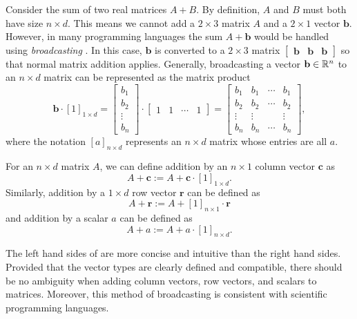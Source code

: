 \def\b{\mathbf{b}}
Consider the sum of two real matrices \(A + B\).
By definition, \(A\) and \(B\) must both have size \(n \times d\).
This means we cannot add a \(2 \times 3\) matrix \(A\) and a \(2 \times 1\) vector \(\b\).
However, in many programming languages the sum \(A + \b\) would be handled using \textit{broadcasting} \cite{harris2020array}.
In this case, \(\b\) is converted to a \(2 \times 3\) matrix \(\begin{bmatrix} \b & \b & \b \end{bmatrix}\) so that normal matrix addition applies.
Generally, broadcasting a vector \(\b \in \RR^n\) to an \(n \times d\) matrix can be represented as the matrix product
\begin{equation}
    \label{eqn:vector-broadcasting}
    \b \cdot [1]_{1 \times d}
    = \begin{bmatrix}
        b_1 \\ b_2 \\ \vdots \\ b_n
    \end{bmatrix}
    \cdot
    \begin{bmatrix}
        1 & 1 & \cdots & 1
    \end{bmatrix}
    = \begin{bmatrix}
        b_1 & b_1 & \cdots & b_1 \\
        b_2 & b_2 & \cdots & b_2 \\
        \vdots & \vdots & & \vdots \\
        b_n & b_n & \cdots & b_n
    \end{bmatrix},
\end{equation}
where the notation \([a]_{n \times d}\) represents an \(n \times d\) matrix whose entries are all \(a\).
\begin{definition}
    \label{def:broadcast-addition}
    For an \(n \times d\) matrix \(A\), we can define addition by an \(n \times 1\) column vector \(\mathbf{c}\) as
    \begin{equation}
        \label{eqn:matrix-col-vector-addition}
        A + \mathbf{c} := A + \mathbf{c} \cdot [1]_{1 \times d}.
    \end{equation}
    Similarly, addition by a \(1 \times d\) row vector \(\mathbf{r}\) can be defined as
    \begin{equation}
        \label{eqn:matrix-row-vector-addition}
        A + \mathbf{r} := A + [1]_{n \times 1} \cdot \mathbf{r}
    \end{equation}
    and addition by a scalar \(a\) can be defined as
    \begin{equation}
        \label{eqn:matrix-scalar-addition}
        A + a := A + a \cdot [1]_{n \times d}.
    \end{equation}
\end{definition}

The left hand sides of  are more concise and intuitive than the right hand sides.
Provided that the vector types are clearly defined and compatible, there should be no ambiguity when adding column vectors, row vectors, and scalars to matrices.
Moreover, this method of broadcasting is consistent with scientific programming languages.